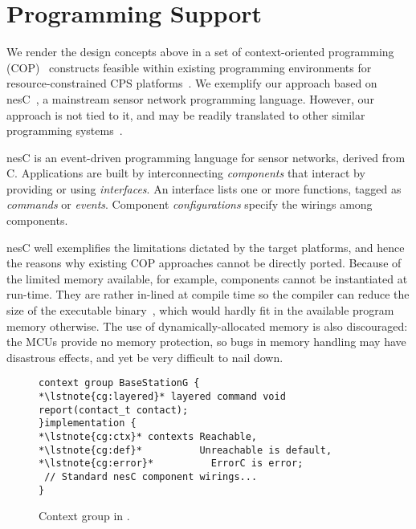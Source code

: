 \section{Programming Support}
\label{sec:conesc}

We render the design concepts above in a set of context-oriented
programming (COP)~\cite{Hirschfeld08} constructs feasible within
existing programming environments for resource-constrained CPS
platforms~\cite{mottola10:survey}.  We exemplify our approach based on
nesC~\cite{gay03nesc}, a mainstream sensor network programming
language. However, our approach is not tied to it, and may be readily
translated to other similar programming systems~\cite{mottola10:survey}.

 nesC is an event-driven programming language
for sensor networks, derived from C. Applications are built by
interconnecting \emph{components} that interact by providing or using
\emph{interfaces}. An interface lists one or more functions, tagged as
\emph{commands} or \emph{events}. %
Component \emph{configurations} specify the wirings among
components. %

nesC well exemplifies the limitations dictated by the target
platforms, and hence the reasons why existing COP approaches cannot be
directly ported. Because of the limited memory available, for example,
components cannot be instantiated at run-time. They are rather
in-lined at compile time so the compiler can reduce the size of the
executable binary~\cite{gay03nesc}, which would hardly fit in the available
program memory otherwise.  The use of dynamically-allocated memory is
also discouraged: the MCUs provide no memory protection, so bugs in
memory handling may have disastrous effects, and yet be very difficult
to nail down.

\begin{figure}[!tb]
\begin{lstlisting}[style=conescframe]
context group BaseStationG {
*\lstnote{cg:layered}* layered command void report(contact_t contact);
}implementation {
*\lstnote{cg:ctx}* contexts Reachable, 
*\lstnote{cg:def}*          Unreachable is default,
*\lstnote{cg:error}*          ErrorC is error;
 // Standard nesC component wirings...
}
\end{lstlisting}
\vspace{-4mm}
\caption{Context group in \conesc.}
  \label{fig:configuration}
\vspace{-2mm}
\end{figure}


